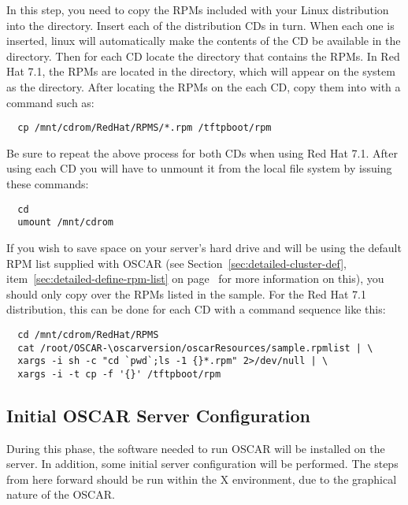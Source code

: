 In this step, you need to copy the RPMs included with your Linux
distribution into the  directory. 
\begchange
Insert each of the distribution CDs in turn.
When each one is inserted, linux will automatically make the
contents of the CD be available in the  directory.
Then for each CD locate the directory that contains the RPMs.
In Red Hat 7.1, the RPMs are located in the 
directory, which will appear on the system as the 
 directory. 
\endchange
 After locating the RPMs on the each CD, copy them into
 with a command such as:

\begin{verbatim}
  cp /mnt/cdrom/RedHat/RPMS/*.rpm /tftpboot/rpm
\end{verbatim}
  
Be sure to repeat the above process for both CDs when using Red Hat
7.1.
\begchange
After using each CD you will have to unmount it from the local
file system by issuing these commands:

\begin{verbatim}
  cd
  umount /mnt/cdrom
\end{verbatim}
\endchange
If you wish to save space on your server's hard drive and will be
using the default RPM list supplied with OSCAR (see
Section~\ref{sec:detailed-cluster-def},
item~\ref{sec:detailed-define-rpm-list} on
page~\pageref{sec:detailed-define-rpm-list} for more information on
this), you should only copy over the RPMs listed in the sample.
\begchange
For the Red Hat 7.1 distribution, this can be done for each CD with
a command sequence like this:

\begin{verbatim}
  cd /mnt/cdrom/RedHat/RPMS
  cat /root/OSCAR-\oscarversion/oscarResources/sample.rpmlist | \
  xargs -i sh -c "cd `pwd`;ls -1 {}*.rpm" 2>/dev/null | \
  xargs -i -t cp -f '{}' /tftpboot/rpm
\end{verbatim}

\endchange

  
\subsection{Initial OSCAR Server Configuration}

During this phase, the software needed to run OSCAR will be installed
on the server. In addition, some initial server configuration will be
performed. The steps from here forward should be run within the X
environment, due to the graphical nature of the OSCAR.

